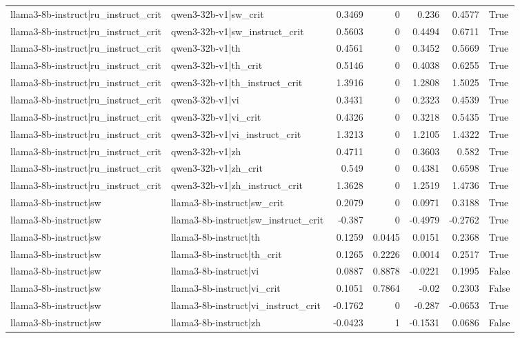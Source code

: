 \begin{table}
\begin{tabular}{l l r r r r l}
llama3-8b-instruct|ru_instruct_crit & qwen3-32b-v1|sw_crit & 0.3469 & 0 & 0.236 & 0.4577 & True \\
llama3-8b-instruct|ru_instruct_crit & qwen3-32b-v1|sw_instruct_crit & 0.5603 & 0 & 0.4494 & 0.6711 & True \\
llama3-8b-instruct|ru_instruct_crit & qwen3-32b-v1|th & 0.4561 & 0 & 0.3452 & 0.5669 & True \\
llama3-8b-instruct|ru_instruct_crit & qwen3-32b-v1|th_crit & 0.5146 & 0 & 0.4038 & 0.6255 & True \\
llama3-8b-instruct|ru_instruct_crit & qwen3-32b-v1|th_instruct_crit & 1.3916 & 0 & 1.2808 & 1.5025 & True \\
llama3-8b-instruct|ru_instruct_crit & qwen3-32b-v1|vi & 0.3431 & 0 & 0.2323 & 0.4539 & True \\
llama3-8b-instruct|ru_instruct_crit & qwen3-32b-v1|vi_crit & 0.4326 & 0 & 0.3218 & 0.5435 & True \\
llama3-8b-instruct|ru_instruct_crit & qwen3-32b-v1|vi_instruct_crit & 1.3213 & 0 & 1.2105 & 1.4322 & True \\
llama3-8b-instruct|ru_instruct_crit & qwen3-32b-v1|zh & 0.4711 & 0 & 0.3603 & 0.582 & True \\
llama3-8b-instruct|ru_instruct_crit & qwen3-32b-v1|zh_crit & 0.549 & 0 & 0.4381 & 0.6598 & True \\
llama3-8b-instruct|ru_instruct_crit & qwen3-32b-v1|zh_instruct_crit & 1.3628 & 0 & 1.2519 & 1.4736 & True \\
llama3-8b-instruct|sw & llama3-8b-instruct|sw_crit & 0.2079 & 0 & 0.0971 & 0.3188 & True \\
llama3-8b-instruct|sw & llama3-8b-instruct|sw_instruct_crit & -0.387 & 0 & -0.4979 & -0.2762 & True \\
llama3-8b-instruct|sw & llama3-8b-instruct|th & 0.1259 & 0.0445 & 0.0151 & 0.2368 & True \\
llama3-8b-instruct|sw & llama3-8b-instruct|th_crit & 0.1265 & 0.2226 & 0.0014 & 0.2517 & True \\
llama3-8b-instruct|sw & llama3-8b-instruct|vi & 0.0887 & 0.8878 & -0.0221 & 0.1995 & False \\
llama3-8b-instruct|sw & llama3-8b-instruct|vi_crit & 0.1051 & 0.7864 & -0.02 & 0.2303 & False \\
llama3-8b-instruct|sw & llama3-8b-instruct|vi_instruct_crit & -0.1762 & 0 & -0.287 & -0.0653 & True \\
llama3-8b-instruct|sw & llama3-8b-instruct|zh & -0.0423 & 1 & -0.1531 & 0.0686 & False \\

\end{tabular}
\end{table}
